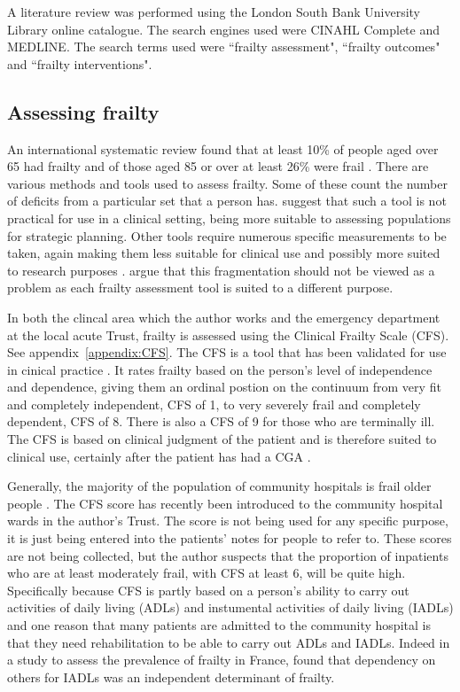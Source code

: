 \documentclass
[
	12pt,
	a4paper,
	oneside,
]{article}
\begin{document}
A literature review was performed using the London South Bank University Library 
online catalogue. The search engines used were CINAHL Complete and MEDLINE. The
search terms used were ``frailty assessment", ``frailty outcomes" and ``frailty 
interventions".

\subsection{Assessing frailty}
An international systematic review found 
that at least 10\% of people aged over 65 had frailty and of those aged 85 or over
at least 26\% were frail \parencite{collard:12}. There are various methods and tools used to assess frailty.
Some of these count the number of deficits from a particular set that a person has. 
\textcite{sternberg:08} suggest that such a tool is not practical for use in a clinical
setting, being more suitable to assessing populations for strategic planning. 
Other tools require numerous specific measurements to be taken, again making them
less suitable for clinical use \parencite{martin:08} and possibly more suited to research purposes
\parencite{ensrud:08}. \textcite{romero-ortuno:16} argue that this fragmentation should not
be viewed as a problem as each frailty assessment tool is suited to a different 
purpose. 

In both the clincal area which the author works and the emergency department at
the local acute Trust, frailty is assessed using the Clinical Frailty Scale (CFS).
See appendix~\ref{appendix:CFS}.
The CFS is a tool that has been validated for use in cinical practice 
\parencite{rockwood:05}. It rates frailty based on the person's level of independence
and dependence, giving them an ordinal postion on the continuum from very fit and completely 
independent, CFS of 1, to very severely frail and completely dependent, CFS of 8.
There is also a CFS of 9 for those who are terminally ill. The CFS is based on clinical
judgment of the patient and is therefore suited to clinical use, certainly after
the patient has had a CGA \parencite{bgs:14}.

Generally, the majority of the population of community hospitals is frail older 
people \parencite{silver:12}.
The CFS score has recently been introduced to the community hospital wards in the author's Trust. The
score is not being used for any specific purpose, it is just being entered into 
the patients' notes for people to refer to. These scores are not being collected, 
but the author suspects that the proportion of inpatients who are at least 
moderately frail, with CFS at least 6, will be quite high. Specifically because
CFS is partly based on a person's ability to carry out activities of daily living (ADLs)
and instumental activities of daily living (IADLs) and one reason that many patients
are admitted to the community hospital is that they need rehabilitation to be
able to carry out ADLs and IADLs. Indeed in a study to assess the prevalence of frailty
in France, \textcite{cossec:16} found that dependency on others for IADLs was an 
independent determinant of frailty.
\end{document}
